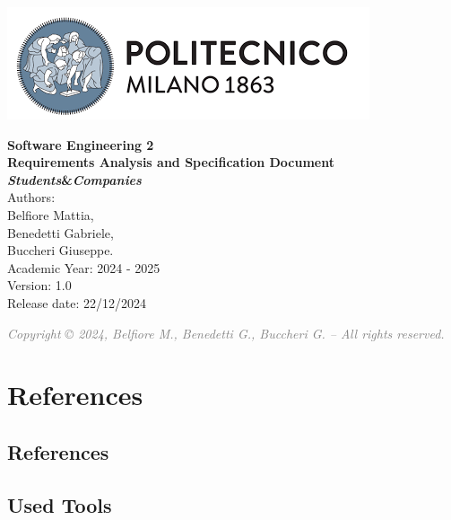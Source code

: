 \documentclass[11pt,twoside]{article}
\begin{document}
\begin{titlepage}
    \begin{center}
        \includegraphics[scale=0.5]{Images/PolimiLogo.png} \\[2cm]
    \end{center}
    
    \begin{center}
        {\color{bluepoli}\textbf{\Huge{Software Engineering 2 \\[1cm] Requirements Analysis and Specification Document \\[0.5cm] \textit{Students}\&\textit{Companies}}}} \\[5cm]
        {\Large Authors: \\ Belfiore Mattia, \\ Benedetti Gabriele, \\ Buccheri Giuseppe.} \\[1cm]
        {\large Academic Year: 2024 - 2025} \\[0.5cm]
        {\large Version: 1.0} \\[0.5cm]
        {\large Release date: 22/12/2024} \\[2cm]
    \end{center}

    \vfill
    
    \begin{flushright}
        {\footnotesize \textcolor{Gray}{\emph{Copyright © 2024, Belfiore M., Benedetti G., Buccheri G. – All rights reserved.}}}
    \end{flushright}
\end{titlepage}

\clearpage
\tableofcontents
\newpage







\section{References}
\subsection{References}
\subsection{Used Tools}

\end{document}
